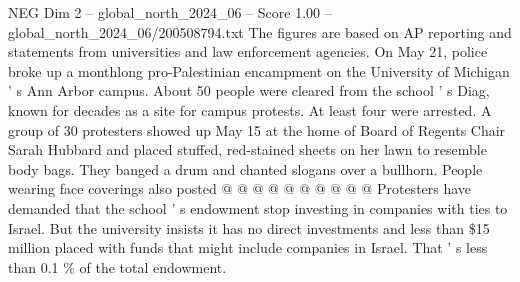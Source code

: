 \begin{textsample}{NEG Dim 2 – global\_north\_2024\_06 – Score 1.00 – global\_north\_2024\_06/200508794.txt}
The figures are based on AP reporting and statements from universities and law enforcement agencies.
On May 21, police broke up a monthlong pro-Palestinian encampment on the University of Michigan ' s Ann Arbor campus.
About 50 people were cleared from the school ' s Diag, known for decades as a site for campus protests.
At least four were arrested.
A group of 30 protesters showed up May 15 at the home of Board of Regents Chair Sarah Hubbard and placed stuffed, red-stained sheets on her lawn to resemble body bags.
They banged a drum and chanted slogans over a bullhorn.
People wearing face coverings also posted @ @ @ @ @ @ @ @ @ @ Protesters have demanded that the school ' s endowment stop investing in companies with ties to Israel.
But the university insists it has no direct investments and less than \$15 million placed with funds that might include companies in Israel.
That ' s less than 0.1 \% of the total endowment.

\end{textsample}
